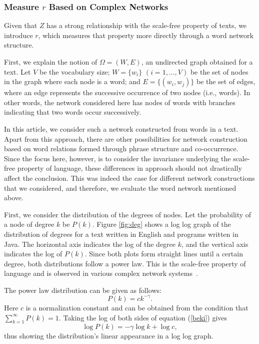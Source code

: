\documentclass[english]{jnlp_1.4_rep}
\begin{document}
\subsubsection*{Measure $r$ Based on Complex Networks}

Given that $Z$ has a strong relationship with the scale-free property of texts, we introduce $r$, which measures that property more directly through a word network structure.

First, we explain the notion of $\Omega=(W,E)$, an undirected graph obtained for a text. Let $V$ be the vocabulary size; $W=\{w_i\}$ $(i=1,\ldots,V)$ be the set of nodes in the graph where each node is a word; and $E=\{(w_i,w_j)\}$ be the set of edges, where an edge represents the successive occurrence of two nodes (i.e., words). In other words, the network considered here has nodes of words with branches indicating that two words occur successively. 

In this article, we consider such a network constructed from words in a text. Apart from this approach, there are other possibilities for network construction based on word relations formed through phrase structure and co-occurrence. Since the focus here, however, is to consider the invariance underlying the scale-free property of language, these differences in approach should not drastically affect the conclusion. This was indeed the case for different network constructions that we considered, and therefore, we evaluate the word network mentioned above.

First, we consider the distribution of the degrees of nodes. Let the probability of a node of degree $k$ be $P(k)$. Figure \ref{fig:deg} 
shows a log log graph of the distribution of degrees for a text written in English and programs written in Java. The horizontal axis indicates the log of the degree $k$, and the vertical axis indicates the log of $P(k)$. Since both plots form straight lines until a certain degree, both distributions follow a power law. This is the scale-free property of language and is observed in various complex network systems~\cite{Barabasi}.

The power law distribution can be given as follows: 
\begin{equation}
P(k)=ck^{-\gamma}.  \label{beki}
\end{equation}
Here $c$ is a normalization constant and can be obtained from the condition that $\sum_{k=1}^{\infty}P(k)=1$. Taking the log of both sides of equation (\ref{beki}) gives 
\begin{equation}
\log P(k)=-\gamma \log k+ \log c \label{log},    
\end{equation}
thus showing the distribution's linear appearance in a log log graph.
 
\end{document}
